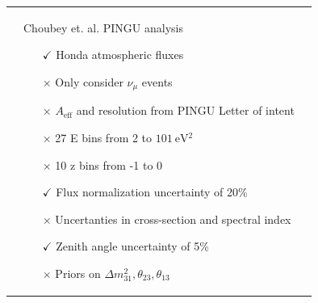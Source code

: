 \documentclass[draft=True]{revtex4-2}
\newcommand{\nm}{\nu_\mu}
\begin{document}
\begin{tabular}{p{55mm}p{55mm}p{55mm}}
\begin{itemize}
      \end{itemize} &
    Choubey et. al. PINGU analysis
      \begin{itemize}
         \item[$\checkmark$] Honda atmospheric fluxes
         \item[$\times$] Only consider $\nm$ events
         \vspace{1em} 
         \item[$\times$] $A_\text{eff}$ and resolution from PINGU Letter of intent
         \item[$\times$] 27 E bins from 2 to $\SI{101}{\electronvolt^2}$
         \item[$\times$] 10 z bins from -1 to 0
         \item[$\checkmark$] Flux normalization uncertainty of 20\%
         \item[$\times$] Uncertanties in cross-section and spectral index 
         \item[$\checkmark$] Zenith angle uncertainty of 5\% 
         \item[$\times$] Priors on $\Delta m_{31}^2, \theta_{23},\theta_{13}$
      \end{itemize} 
\end{tabular}



\end{document}
